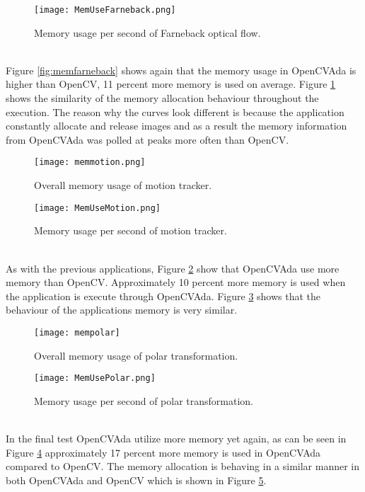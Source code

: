 \begin{figure}
\centering
\texttt{[image: MemUseFarneback.png]}
\caption{Memory usage per second of Farneback optical flow.}
\label{fig:MemUseFarneback}
\end{figure}
\\Figure \ref{fig:memfarneback} shows again that the memory usage in OpenCVAda is higher than OpenCV, 11 percent more memory is used on average. Figure \ref{fig:MemUseFarneback} shows the similarity of the memory allocation behaviour throughout the execution. The reason why the curves look different is because the application constantly allocate and release images and as a result the memory information from OpenCVAda was polled at peaks more often than OpenCV.
\begin{figure}
\centering
\texttt{[image: memmotion.png]}
\caption{Overall memory usage of motion tracker.}
\label{fig:memmotion}
\end{figure}
\begin{figure}
\centering
\texttt{[image: MemUseMotion.png]}
\caption{Memory usage per second of motion tracker.}
\label{fig:MemUseMotion}
\end{figure}
\\As with the previous applications, Figure \ref{fig:memmotion} show that OpenCVAda use more memory than OpenCV. Approximately 10 percent more memory is used when the application is execute through OpenCVAda. Figure \ref{fig:MemUseMotion} shows that the behaviour of the applications memory is very similar.
\begin{figure}
\centering
\texttt{[image: mempolar]}
\caption{Overall memory usage of polar transformation.}
\label{fig:mempolar}
\end{figure}
\begin{figure}
\centering
\texttt{[image: MemUsePolar.png]}
\caption{Memory usage per second of polar transformation.}
\label{fig:MemUsePolar}
\end{figure}
\\In the final test OpenCVAda utilize more memory yet again, as can be seen in Figure \ref{fig:mempolar} approximately 17 percent more memory is used in OpenCVAda compared to OpenCV. The memory allocation is behaving in a similar manner in both OpenCVAda and OpenCV which is shown in Figure \ref{fig:MemUsePolar}.
